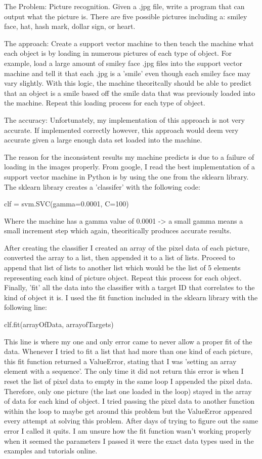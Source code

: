 \documentclass[a4paper,12pt]{article}
\begin{document}
The Problem: Picture recognition. Given a .jpg file, write a program that can output what the picture is. There are five possible pictures including a: smiley face, hat, hash mark, dollar sign, or heart.

The approach: Create a support vector machine to then teach the machine what each object is by loading in numerous pictures of each type of object. For example, load a large amount of smiley face .jpg files into the support vector machine and tell it that each .jpg is a 'smile' even though each smiley face may vary slightly. With this logic, the machine theoritcally should be able to predict that an object is a smile based off the smile data that was previously loaded into the machine. Repeat this loading process for each type of object.

The accuracy: Unfortunately, my implementation of this approach is not very accurate. If implemented correctly however, this approach would deem very accurate given a large enough data set loaded into the machine. 

The reason for the inconsistent results my machine predicts is due to a failure of loading in the images properly. From google, I read the best implementation of a support vector machine in Python is by using the one from the sklearn library. The sklearn library creates a 'classifer' with the following code:

clf = svm.SVC(gamma=0.0001, C=100)

Where the machine has a gamma value of 0.0001 -> a small gamma means a small increment step which again, theoritically produces accurate results.

After creating the classifier I created an array of the pixel data of each picture, converted the array to a list, then appended it to a list of lists. Proceed to append that list of lists to another list which would be the list of 5 elements representing each kind of picture object. Repeat this process for each object. Finally, 'fit' all the data into the classifier with a target ID that correlates to the kind of object it is. I used the fit function included in the sklearn library with the following line:

clf.fit(arrayOfData, arrayofTargets)

This line is where my one and only error came to never allow a proper fit of the data. Whenever I tried to fit a list that had more than one kind of each picture, this fit function returned a ValueError, stating that I was 'setting an array element with a sequence'. The only time it did not return this error is when I reset the list of pixel data to empty in the same loop I appended the pixel data. Therefore, only one picture (the last one loaded in the loop) stayed in the array of data for each kind of object. I tried passing the pixel data to another function within the loop to maybe get around this problem but the ValueError appeared every attempt at solving this problem. After days of trying to figure out the same error I called it quits. I am unsure how the fit function wasn't working properly when it seemed the parameters I passed it were the exact data types used in the examples and tutorials online.
\end{document}

